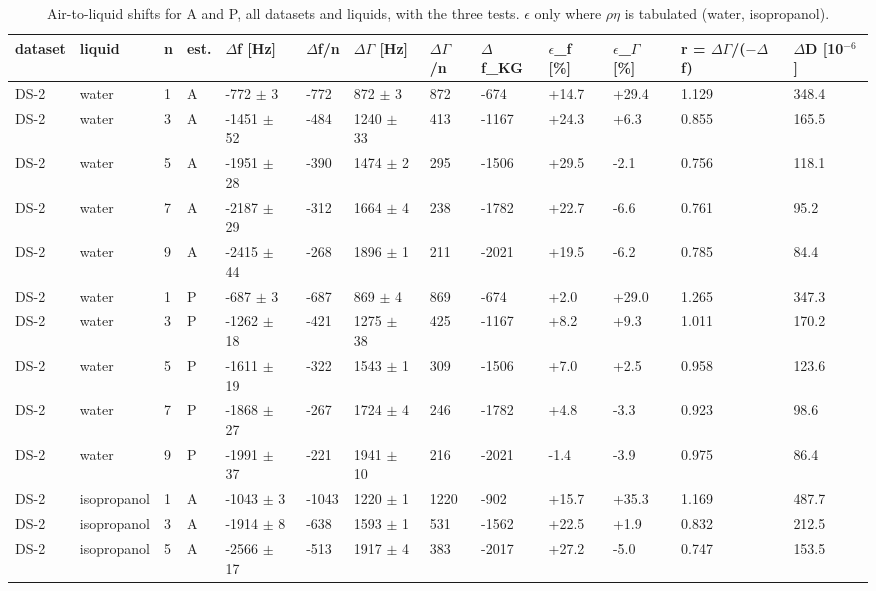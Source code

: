 \documentclass[11pt,a4paper]{article}
\begin{document}
\begin{landscape}{\scriptsize\setlength{\tabcolsep}{2pt}
\begin{longtable}{@{}lllllllllllll@{}}
\caption{Air-to-liquid shifts for A and P, all datasets and liquids, with the three tests. $\epsilon$ only where $\rho$$\eta$ is tabulated (water, isopropanol).}\\
\toprule
dataset & liquid & n & est. & $\Delta$f [Hz] & $\Delta$f/n & $\Delta$$\Gamma$ [Hz] & $\Delta$$\Gamma$/n & $\Delta$f\_KG & $\epsilon$\_f [\%] & $\epsilon$\_$\Gamma$ [\%] & r = $\Delta$$\Gamma$/($-$$\Delta$f) & $\Delta$D [10$^{-6}$] \\\midrule\endhead
DS-2 & water & 1 & A & -772 $\pm$ 3 & -772 & 872 $\pm$ 3 & 872 & -674 & +14.7 & +29.4 & 1.129 & 348.4 \\
DS-2 & water & 3 & A & -1451 $\pm$ 52 & -484 & 1240 $\pm$ 33 & 413 & -1167 & +24.3 & +6.3 & 0.855 & 165.5 \\
DS-2 & water & 5 & A & -1951 $\pm$ 28 & -390 & 1474 $\pm$ 2 & 295 & -1506 & +29.5 & -2.1 & 0.756 & 118.1 \\
DS-2 & water & 7 & A & -2187 $\pm$ 29 & -312 & 1664 $\pm$ 4 & 238 & -1782 & +22.7 & -6.6 & 0.761 & 95.2 \\
DS-2 & water & 9 & A & -2415 $\pm$ 44 & -268 & 1896 $\pm$ 1 & 211 & -2021 & +19.5 & -6.2 & 0.785 & 84.4 \\
DS-2 & water & 1 & P & -687 $\pm$ 3 & -687 & 869 $\pm$ 4 & 869 & -674 & +2.0 & +29.0 & 1.265 & 347.3 \\
DS-2 & water & 3 & P & -1262 $\pm$ 18 & -421 & 1275 $\pm$ 38 & 425 & -1167 & +8.2 & +9.3 & 1.011 & 170.2 \\
DS-2 & water & 5 & P & -1611 $\pm$ 19 & -322 & 1543 $\pm$ 1 & 309 & -1506 & +7.0 & +2.5 & 0.958 & 123.6 \\
DS-2 & water & 7 & P & -1868 $\pm$ 27 & -267 & 1724 $\pm$ 4 & 246 & -1782 & +4.8 & -3.3 & 0.923 & 98.6 \\
DS-2 & water & 9 & P & -1991 $\pm$ 37 & -221 & 1941 $\pm$ 10 & 216 & -2021 & -1.4 & -3.9 & 0.975 & 86.4 \\
DS-2 & isopropanol & 1 & A & -1043 $\pm$ 3 & -1043 & 1220 $\pm$ 1 & 1220 & -902 & +15.7 & +35.3 & 1.169 & 487.7 \\
DS-2 & isopropanol & 3 & A & -1914 $\pm$ 8 & -638 & 1593 $\pm$ 1 & 531 & -1562 & +22.5 & +1.9 & 0.832 & 212.5 \\
DS-2 & isopropanol & 5 & A & -2566 $\pm$ 17 & -513 & 1917 $\pm$ 4 & 383 & -2017 & +27.2 & -5.0 & 0.747 & 153.5 \\

\end{longtable}}
\end{landscape}
\end{document}
